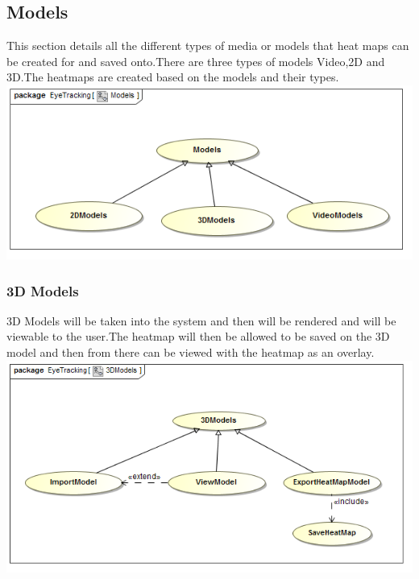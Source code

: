 \subsection{Models}
This section details all the different types of media or models that heat maps can be created for and saved onto.There are three types of models Video,2D and 3D.The heatmaps are created based on the models and their types.
\newline
	\includegraphics[scale=0.5]{Diagrams/Use_Case_Diagram__Models.png}
	
	
	\subsubsection{3D Models}
	3D Models will be taken into the system and then will be rendered and will be viewable to the user.The heatmap will then be allowed to be saved on the 3D model and then from there can be viewed with the heatmap as an overlay.
	\newline
	\includegraphics[scale=0.5]{Diagrams/Use_Case_Diagram__3DModels.png}
	
